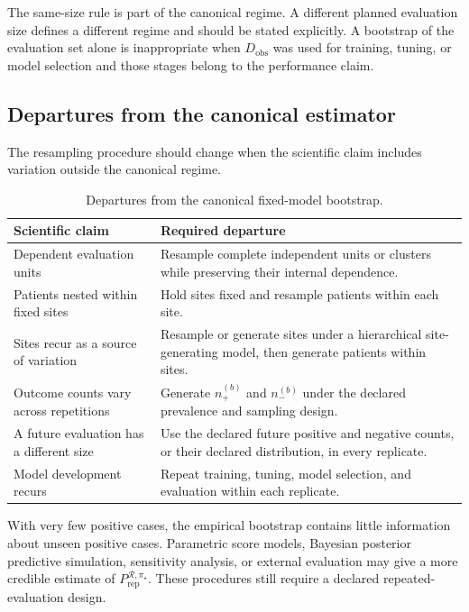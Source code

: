 \documentclass[11pt]{article}
\newcommand{\Regime}{\mathcal{R}}
\newcommand{\PRep}{P_{\mathrm{rep}}^{\Regime,\pi_\star}}
\theoremstyle{remark}
\begin{document}
The same-size rule is part of the canonical regime. A different planned evaluation size defines a different regime and should be stated explicitly. A bootstrap of the evaluation set alone is inappropriate when $D_{\mathrm{obs}}$ was used for training, tuning, or model selection and those stages belong to the performance claim.

\subsection{Departures from the canonical estimator}

The resampling procedure should change when the scientific claim includes variation outside the canonical regime.

\begin{table}[ht]
\centering
\caption{Departures from the canonical fixed-model bootstrap.}
\label{tab:replication}
\begin{tabularx}{\textwidth}{@{}>{\raggedright\arraybackslash}p{}>{\raggedright\arraybackslash}X@{}}
\toprule
Scientific claim & Required departure \\
\midrule
Dependent evaluation units & Resample complete independent units or clusters while preserving their internal dependence. \\
Patients nested within fixed sites & Hold sites fixed and resample patients within each site. \\
Sites recur as a source of variation & Resample or generate sites under a hierarchical site-generating model, then generate patients within sites. \\
Outcome counts vary across repetitions & Generate $n_+^{(b)}$ and $n_-^{(b)}$ under the declared prevalence and sampling design. \\
A future evaluation has a different size & Use the declared future positive and negative counts, or their declared distribution, in every replicate. \\
Model development recurs & Repeat training, tuning, model selection, and evaluation within each replicate. \\
\bottomrule
\end{tabularx}
\end{table}

With very few positive cases, the empirical bootstrap contains little information about unseen positive cases. Parametric score models, Bayesian posterior predictive simulation, sensitivity analysis, or external evaluation may give a more credible estimate of $\PRep$. These procedures still require a declared repeated-evaluation design.
\end{document}

